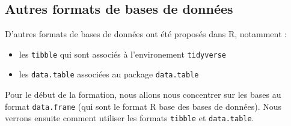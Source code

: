 \documentclass[
]{book}
\providecommand{\tightlist}{%
  \setlength{\itemsep}{0pt}\setlength{\parskip}{0pt}}
\begin{document}
\subsection{Autres formats de bases de données}\label{autres-formats-de-bases-de-donnuxe9es}

D'autres formats de bases de données ont été proposés dans R, notamment :

\begin{itemize}
\tightlist
\item
  les \texttt{tibble} qui sont associés à l'environement \texttt{tidyverse}
\item
  les \texttt{data.table} associées au package \texttt{data.table}
\end{itemize}

Pour le début de la formation, nous allons nous concentrer sur les bases au format \texttt{data.frame} (qui sont le format R base des bases de données). Nous verrons ensuite comment utiliser les formats \texttt{tibble} et \texttt{data.table}.
\end{document}
